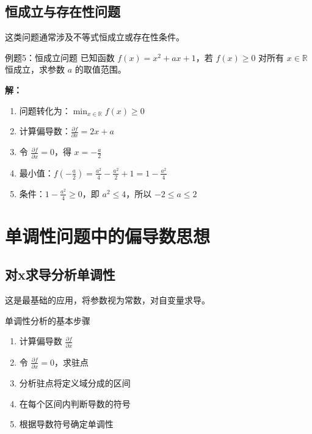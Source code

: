 \documentclass[a4paper,11pt]{ctexart}
\newcommand{\partialder}[2]{\frac{\partial #1}{\partial #2}}
\theoremstyle{definition}
\theoremstyle{remark}
\begin{document}
\subsection{恒成立与存在性问题}

这类问题通常涉及不等式恒成立或存在性条件。

\begin{examplebox}{例题5：恒成立问题}
已知函数 $f(x) = x^2 + ax + 1$，若 $f(x) \geq 0$ 对所有 $x \in \mathbb{R}$ 恒成立，求参数 $a$ 的取值范围。

\textbf{解：}
\begin{enumerate}
    \item 问题转化为：$\min_{x \in \mathbb{R}} f(x) \geq 0$
    \item 计算偏导数：$\partialder{f}{x} = 2x + a$
    \item 令 $\partialder{f}{x} = 0$，得 $x = -\frac{a}{2}$
    \item 最小值：$f(-\frac{a}{2}) = \frac{a^2}{4} - \frac{a^2}{2} + 1 = 1 - \frac{a^2}{4}$
    \item 条件：$1 - \frac{a^2}{4} \geq 0$，即 $a^2 \leq 4$，所以 $-2 \leq a \leq 2$
\end{enumerate}
\end{examplebox}

\section{单调性问题中的偏导数思想}

\subsection{对x求导分析单调性}

这是最基础的应用，将参数视为常数，对自变量求导。

\begin{methodbox}{单调性分析的基本步骤}
\begin{enumerate}
    \item 计算偏导数 $\partialder{f}{x}$
    \item 令 $\partialder{f}{x} = 0$，求驻点
    \item 分析驻点将定义域分成的区间
    \item 在每个区间内判断导数的符号
    \item 根据导数符号确定单调性
\end{enumerate}
\end{methodbox}
\end{document}
